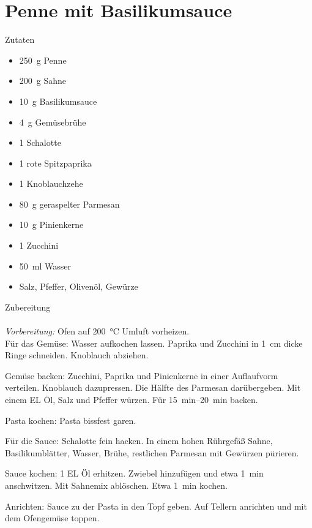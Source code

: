 \section*{Penne mit Basilikumsauce}
\ihead{}\ohead{}
\cfoot{}
{\Large Zutaten}
\begin{multicols}{2}
\begin{itemize}
    \item \SI{250}{g} Penne
    \item \SI{200}{g} Sahne
    \item \SI{10}{g} Basilikumsauce
    \item \SI{4}{g} Gemüsebrühe
    \item \num{1} Schalotte
    \item \num{1} rote Spitzpaprika
    \item \num{1} Knoblauchzehe
    \item \SI{80}{g} geraspelter Parmesan
    \item \SI{10}{g} Pinienkerne
    \item \num{1} Zucchini
    \item \SI{50}{ml} Wasser
    \item Salz, Pfeffer, Olivenöl, Gewürze
\end{itemize}
\end{multicols}
\noindent
{\Large Zubereitung}\\
\\
\textit{Vorbereitung:} Ofen auf \SI{200}{\celsius} Umluft vorheizen.\\
Für das Gemüse: Wasser aufkochen lassen. 
Paprika und Zucchini in \SI{1}{cm} dicke Ringe schneiden. 
Knoblauch abziehen.

Gemüse backen: Zucchini, Paprika und Pinienkerne in einer Auflaufvorm verteilen. 
Knoblauch dazupressen.
Die Hälfte des Parmesan darübergeben.
Mit einem EL Öl, Salz und Pfeffer würzen.
Für \SIrange{15}{20}{min} backen.

Pasta kochen: Pasta bissfest garen.

Für die Sauce: Schalotte fein hacken. 
In einem hohen Rührgefäß Sahne, Basilikumblätter, Wasser, Brühe, restlichen Parmesan mit Gewürzen pürieren.

Sauce kochen: \num{1} EL Öl erhitzen. 
Zwiebel hinzufügen und etwa \SI{1}{min} anschwitzen. 
Mit Sahnemix ablöschen. 
Etwa \SI{1}{min} kochen.

Anrichten: Sauce zu der Pasta in den Topf geben. 
Auf Tellern anrichten und mit dem Ofengemüse toppen. 